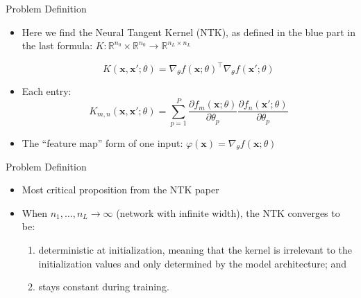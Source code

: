 \documentclass[serif, aspectratio=169]{beamer}
\begin{document}
\begin{frame}{Problem Definition}
	
	\begin{itemize}
		\item Here we find the Neural Tangent Kernel (NTK), as defined in the blue part in the last formula: \(K: \mathbb{R}^{n_0}\times\mathbb{R}^{n_0} \to \mathbb{R}^{n_L \times n_L}\)
		
		\[
		K(\mathbf{x}, \mathbf{x}'; \theta) = \nabla_\theta f(\mathbf{x};\theta)^\top \nabla_\theta f(\mathbf{x}'; \theta)
		\]
		\item Each entry:
		\[
		K_{m,n}(\mathbf{x}, \mathbf{x}'; \theta) = \sum_{p=1}^P \frac{\partial f_m(\mathbf{x};\theta)}{\partial \theta_p} \frac{\partial f_n(\mathbf{x}';\theta)}{\partial \theta_p}
		\]
		\item The “feature map” form of one input: \(\varphi(\mathbf{x}) = \nabla_\theta f(\mathbf{x};\theta)\)
	\end{itemize}
\end{frame}



\begin{frame}{Problem Definition}
	
	\begin{itemize}
		\item Most critical proposition from the NTK paper
		\item When \(n_1, \dots, n_L \to \infty\) (network with infinite width), the NTK converges to be:
		\begin{enumerate}
				\item deterministic at initialization, meaning that the kernel is irrelevant to the initialization values and only determined by the model architecture; and
			\item stays constant during training.
		\end{enumerate}
	
		
	\end{itemize}
\end{frame}
\end{document}
